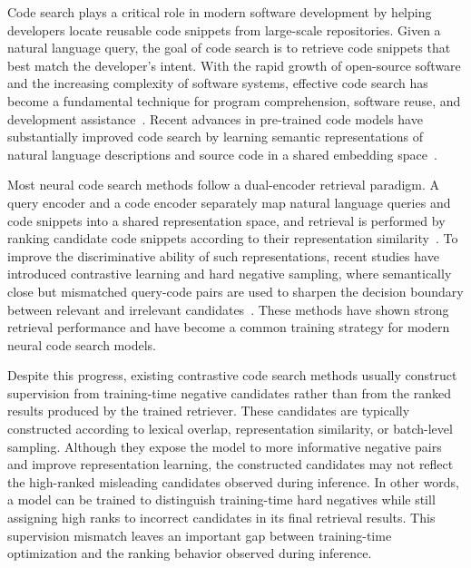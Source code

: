 \documentclass[10pt,conference]{IEEEtran}
\begin{document}
Code search plays a critical role in modern software development by helping developers locate reusable code snippets from large-scale repositories. Given a natural language query, the goal of code search is to retrieve code snippets that best match the developer's intent. With the rapid growth of open-source software and the increasing complexity of software systems, effective code search has become a fundamental technique for program comprehension, software reuse, and development assistance~\cite{CodeSearchSurvey,CodeSearchNet}. Recent advances in pre-trained code models have substantially improved code search by learning semantic representations of natural language descriptions and source code in a shared embedding space~\cite{CodeBERT,GraphCodeBERT,UniXcoder}.

Most neural code search methods follow a dual-encoder retrieval paradigm. A query encoder and a code encoder separately map natural language queries and code snippets into a shared representation space, and retrieval is performed by ranking candidate code snippets according to their representation similarity~\cite{CodeBERT,GraphCodeBERT,UniXcoder,CoCoSoDa}. To improve the discriminative ability of such representations, recent studies have introduced contrastive learning and hard negative sampling, where semantically close but mismatched query-code pairs are used to sharpen the decision boundary between relevant and irrelevant candidates~\cite{CodeRetriever,CoCoSoDa,AAAIUA,CoCoHaNeRe,HedgeCode}. These methods have shown strong retrieval performance and have become a common training strategy for modern neural code search models.

Despite this progress, existing contrastive code search methods usually construct supervision from training-time negative candidates rather than from the ranked results produced by the trained retriever. These candidates are typically constructed according to lexical overlap, representation similarity, or batch-level sampling. Although they expose the model to more informative negative pairs and improve representation learning, the constructed candidates may not reflect the high-ranked misleading candidates observed during inference. In other words, a model can be trained to distinguish training-time hard negatives while still assigning high ranks to incorrect candidates in its final retrieval results. This supervision mismatch leaves an important gap between training-time optimization and the ranking behavior observed during inference.
\end{document}
